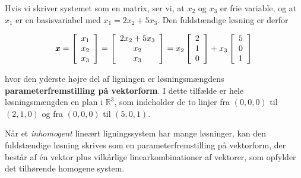 \begin{solution}

Hvis vi skriver systemet som en matrix, ser vi, at $x_2$ og $x_3$ er frie variable, og at $x_1$ er en basisvariabel med $x_1=2 x_2+5 x_3$. Den fuldstændige løsning er derfor

$$
\pmb{x}=\left[\begin{array}{l}
x_1 \\
x_2 \\
x_3
\end{array}\right]=\left[\begin{array}{c}
2 x_2+5 x_3 \\
x_2 \\
x_3
\end{array}\right]=x_2\left[\begin{array}{l}
2 \\
1 \\
0
\end{array}\right]+x_3\left[\begin{array}{l}
5 \\
0 \\
1
\end{array}\right]
$$

hvor den yderste højre del af ligningen er løsningsmængdens \textbf{parameterfremstilling på vektorform}. I dette tilfælde er hele løsningsmængden en plan i $\mathbb{R}^3$, som indeholder de to linjer fra $(0,0,0)$ til $(2,1,0)$ og fra $(0,0,0)$ til $(5,0,1)$.
\end{solution}

Når et \textit{inhomogent} lineært ligningssystem har mange løsninger, kan den fuldstændige løsning skrives som en parameterfremstilling på vektorform, der består af én vektor plus vilkårlige linearkombinationer af vektorer, som opfylder det tilhørende homogene system.

